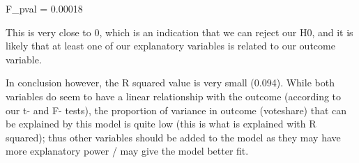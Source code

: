 \documentclass[12pt,letterpaper]{article}
\begin{document}
\begin{enumerate}
	
	
	F\_pval = 0.00018
	
	This is very close to 0, which is an indication that we can reject our H0, and it is likely that at least one of our explanatory variables is related to our outcome variable. 
	
	In conclusion however, the R squared value is very small (0.094). While both variables do seem to have a linear relationship with the outcome (according to our t- and F- tests), the proportion of variance in outcome (voteshare) that can be explained by this model is quite low (this is what is explained with R squared); thus other variables should be added to the model as they may have more explanatory power / may give the model better fit.
	
\end{enumerate}  
\end{document}
